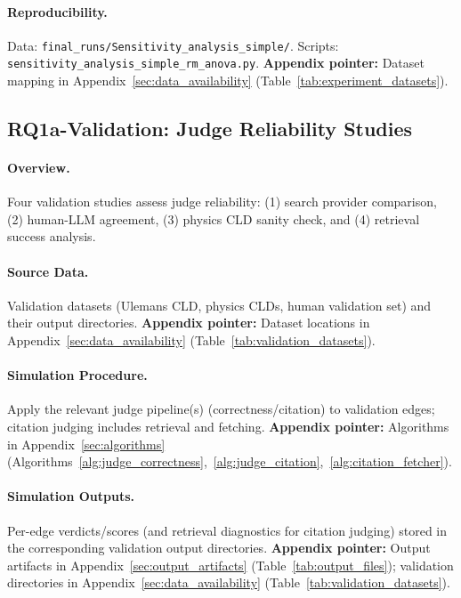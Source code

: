 \paragraph{Reproducibility.}
Data: \texttt{final\_runs/Sensitivity\_analysis\_simple/}. Scripts: \texttt{sensitivity\_analysis\_simple\_rm\_anova.py}.
\textbf{Appendix pointer:} Dataset mapping in Appendix~\ref{sec:data_availability} (Table~\ref{tab:experiment_datasets}).

\subsection{RQ1a-Validation: Judge Reliability Studies}
\label{sec:rq1a_validation_studies}

\paragraph{Overview.}
Four validation studies assess judge reliability: (1) search provider comparison, (2) human-LLM agreement, (3) physics CLD sanity check, and (4) retrieval success analysis.

\paragraph{Source Data.}
Validation datasets (Ulemans CLD, physics CLDs, human validation set) and their output directories.
\textbf{Appendix pointer:} Dataset locations in Appendix~\ref{sec:data_availability} (Table~\ref{tab:validation_datasets}).

\paragraph{Simulation Procedure.}
Apply the relevant judge pipeline(s) (correctness/citation) to validation edges; citation judging includes retrieval and fetching.
\textbf{Appendix pointer:} Algorithms in Appendix~\ref{sec:algorithms} (Algorithms~\ref{alg:judge_correctness},~\ref{alg:judge_citation},~\ref{alg:citation_fetcher}).

\paragraph{Simulation Outputs.}
Per-edge verdicts/scores (and retrieval diagnostics for citation judging) stored in the corresponding validation output directories.
\textbf{Appendix pointer:} Output artifacts in Appendix~\ref{sec:output_artifacts} (Table~\ref{tab:output_files}); validation directories in Appendix~\ref{sec:data_availability} (Table~\ref{tab:validation_datasets}).

